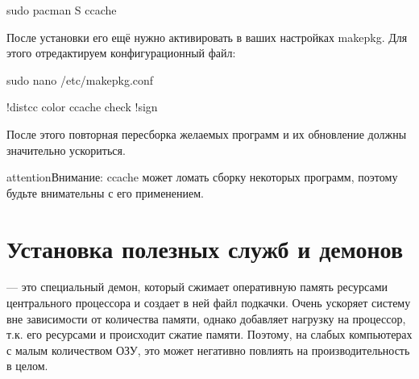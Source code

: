 \documentclass[letterpaper,10pt,russian,openany]{sphinxmanual}
\begin{document}
\sphinxAtStartPar
{}

\begin{sphinxVerbatim}[commandchars=\\\{\}]
sudo pacman \PYGZhy{}S ccache
\end{sphinxVerbatim}

\sphinxAtStartPar
После установки его ещё нужно активировать в ваших настройках makepkg.
Для этого отредактируем конфигурационный файл:

\begin{sphinxVerbatim}[commandchars=\\\{\}]
sudo nano /etc/makepkg.conf

!distcc color ccache check !sign
\end{sphinxVerbatim}

\sphinxAtStartPar
После этого повторная пересборка желаемых программ и их обновление должны значительно ускориться.

\begin{sphinxadmonition}{attention}{Внимание:}
\sphinxAtStartPar
ccache может ломать сборку некоторых программ, поэтому будьте внимательны с его применением.
\end{sphinxadmonition}

\ignorespaces 

\section{Установка полезных служб и демонов}
\label{\detokenize{source/generic-system-acceleration:daemons-and-services}}\label{\detokenize{source/generic-system-acceleration:index-4}}\label{\detokenize{source/generic-system-acceleration:id3}}
\sphinxAtStartPar
{}  — это специальный демон,
который сжимает оперативную память ресурсами центрального процессора и создает в ней файл подкачки.
Очень ускоряет систему вне зависимости от количества памяти, однако добавляет нагрузку на процессор, т.к. его ресурсами и происходит сжатие памяти.
Поэтому, на слабых компьютерах с малым количеством ОЗУ, это может негативно повлиять на производительность в целом.
\end{document}

